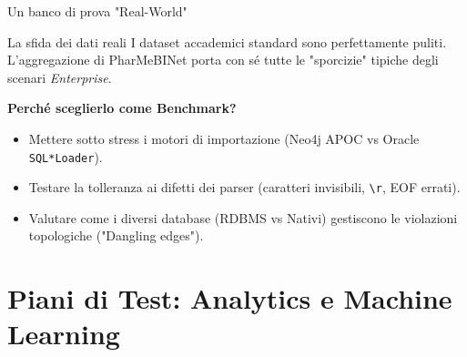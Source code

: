 \documentclass[aspectratio=169]{beamer}
\begin{document}
\begin{frame}{Un banco di prova "Real-World"}
    \begin{alertblock}{\faGlobe \hspace{0.2cm} La sfida dei dati reali}
        \small
        I dataset accademici standard sono perfettamente puliti. L'aggregazione di PharMeBINet porta con sé tutte le "sporcizie" tipiche degli scenari \textit{Enterprise}.
    \end{alertblock}
    
    \vspace{0.2cm}
    \small
    \textbf{Perché sceglierlo come Benchmark?}
    \begin{itemize}
        \item Mettere sotto stress i motori di importazione (Neo4j APOC vs Oracle \texttt{SQL*Loader}).
        \item Testare la tolleranza ai difetti dei parser (caratteri invisibili, \texttt{\textbackslash r}, EOF errati).
        \item Valutare come i diversi database (RDBMS vs Nativi) gestiscono le violazioni topologiche ("Dangling edges").
    \end{itemize}
\end{frame}

\section{Piani di Test: Analytics e Machine Learning}
\end{document}
